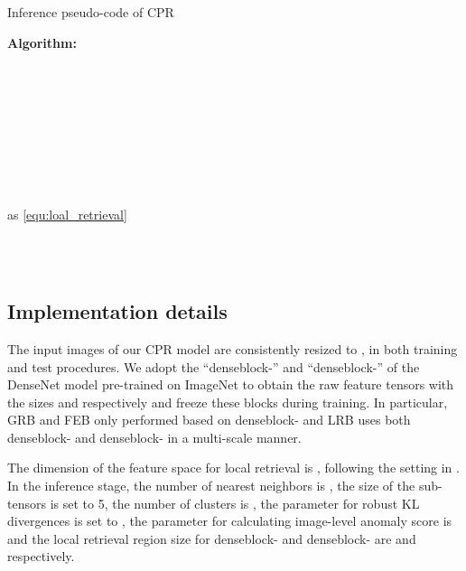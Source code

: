 \documentclass[lettersize,journal]{IEEEtran}
\begin{document}
\begin{algorithm}[htbp]
  \caption{Inference pseudo-code of CPR}
  \label{alg:infer}
  \LinesNumbered
    \textbf{Algorithm:}\\
  \For{}{
  
  }
   \\
  \\

  \\

   \\
  \\


  \For{}
  {

   \\

   \\

   \\

  {
   as \ref{equ:loal_retrieval}
  \\

  }
  \\
  }
  \\
  
\end{algorithm}


\subsection{Implementation details}
\label{subsec:cpr_detail}
The input images of our CPR model are consistently resized to , in both
training and test procedures.
We adopt the ``denseblock-'' and ``denseblock-'' of the DenseNet model
\cite{huang2018densely} pre-trained on ImageNet \cite{russakovsky2015imagenet} to obtain
the raw feature tensors with the sizes  and  respectively and freeze these blocks during training. In particular, GRB and FEB only
performed based on denseblock- and LRB uses both denseblock- and denseblock- in a
multi-scale manner.

The dimension of the feature space for local retrieval is , following the setting in
\cite{roth2022towards}. In the inference stage, the number of  nearest neighbors is ,
the size of the sub-tensors  is set to 5, the number of clusters  is
, the parameter for robust KL divergences  is set to , the parameter  for
calculating image-level anomaly score is  and the local retrieval region size
for denseblock- and denseblock- are  and  respectively.
\end{document}
